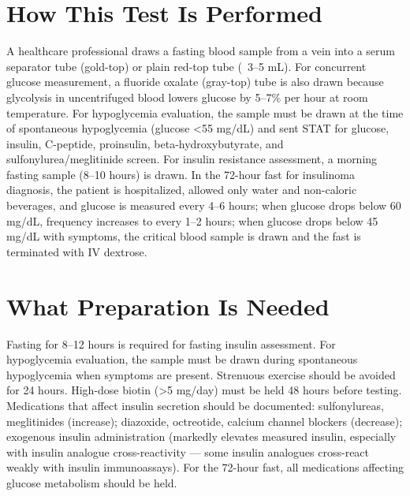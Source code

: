 \section*{How This Test Is Performed}
A healthcare professional draws a fasting blood sample from a vein into a serum separator tube (gold-top) or plain red-top tube (~3--5 mL). For concurrent glucose measurement, a fluoride oxalate (gray-top) tube is also drawn because glycolysis in uncentrifuged blood lowers glucose by 5--7\% per hour at room temperature. For hypoglycemia evaluation, the sample must be drawn at the time of spontaneous hypoglycemia (glucose <55 mg/dL) and sent STAT for glucose, insulin, C-peptide, proinsulin, beta-hydroxybutyrate, and sulfonylurea/meglitinide screen. For insulin resistance assessment, a morning fasting sample (8--10 hours) is drawn. In the 72-hour fast for insulinoma diagnosis, the patient is hospitalized, allowed only water and non-caloric beverages, and glucose is measured every 4--6 hours; when glucose drops below 60 mg/dL, frequency increases to every 1--2 hours; when glucose drops below 45 mg/dL with symptoms, the critical blood sample is drawn and the fast is terminated with IV dextrose.

\section*{What Preparation Is Needed}
Fasting for 8--12 hours is required for fasting insulin assessment. For hypoglycemia evaluation, the sample must be drawn during spontaneous hypoglycemia when symptoms are present. Strenuous exercise should be avoided for 24 hours. High-dose biotin (>5 mg/day) must be held 48 hours before testing. Medications that affect insulin secretion should be documented: sulfonylureas, meglitinides (increase); diazoxide, octreotide, calcium channel blockers (decrease); exogenous insulin administration (markedly elevates measured insulin, especially with insulin analogue cross-reactivity --- some insulin analogues cross-react weakly with insulin immunoassays). For the 72-hour fast, all medications affecting glucose metabolism should be held.

